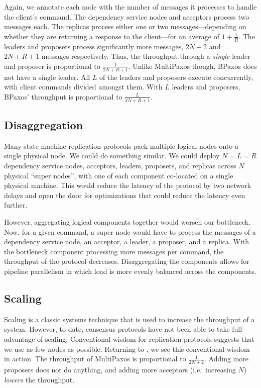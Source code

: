 Again, we annotate each node with the number of messages it processes to handle
the client's command. The dependency service nodes and acceptors process two
messages each. The replicas process either one or two messages---depending on
whether they are returning a response to the client---for an average of
$1+\frac{1}{R}$. The leaders and proposers process significantly more messages,
$2N+2$ and $2N+R+1$ messages respectively. Thus, the throughput through a
\emph{single} leader and proposer is proportional to $\frac{1}{2N+R+1}$. Unlike
MultiPaxos though, BPaxos does not have a single leader. All $L$ of the leaders
and proposers execute concurrently, with client commands divided amongst them.
With $L$ leaders and proposers, BPaxos' throughput is proportional to
$\frac{L}{2N+R+1}$.

\subsection{Disaggregation}
Many state machine replication protocols pack multiple logical nodes onto a
single physical node. We could do something similar. We could deploy $N=L=R$
dependency service nodes, acceptors, leaders, proposers, and replicas across
$N$ physical ``super nodes'', with one of each component co-located on a single
physical machine. This would reduce the latency of the protocol by two network
delays and open the door for optimizations that could reduce the latency even
further.

However, aggregating logical components together would worsen our bottleneck.
Now, for a given command, a super node would have to process the messages of a
dependency service node, an acceptor, a leader, a proposer, and a replica. With
the bottleneck component processing more messages per command, the throughput
of the protocol decreases. Disaggregating the components allows for pipeline
parallelism in which load is more evenly balanced across the components.

\subsection{Scaling}
Scaling is a classic systems technique that is used to increase the throughput
of a system. However, to date, consensus protocols have not been able to take
full advantage of scaling. Conventional wisdom for replication protocols
suggests that we use as few nodes as possible. Returning to
, we see this conventional wisdom in action. The
throughput of MultiPaxos is proportional to $\frac{1}{2N+2}$. Adding more
proposers does not do anything, and adding more acceptors (i.e.\ increasing
$N$) \emph{lowers} the throughput.

